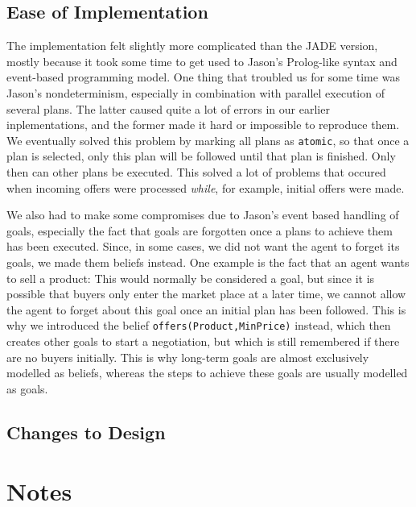 \documentclass[a4paper,11pt]{article}
\begin{document}
\subsection{Ease of Implementation}
The implementation felt slightly more complicated than the JADE version, mostly because it took some time to get used to Jason's Prolog-like syntax and event-based programming model. One thing that troubled us for some time was Jason's nondeterminism, especially in combination with parallel execution of several plans. The latter caused quite a lot of errors in our earlier inplementations, and the former made it hard or impossible to reproduce them. We eventually solved this problem by marking all plans as \texttt{atomic}, so that once a plan is selected, only this plan will be followed until that plan is finished. Only then can other plans be executed. This solved a lot of problems that occured when incoming offers were processed \emph{while}, for example, initial offers were made.

We also had to make some compromises due to Jason's event based handling of goals, especially the fact that goals are forgotten once a plans to achieve them has been executed. Since, in some cases, we did not want the agent to forget its goals, we made them beliefs instead. One example is the fact that an agent wants to sell a product: This would normally be considered a goal, but since it is possible that buyers only enter the market place at a later time, we cannot allow the agent to forget about this goal once an initial plan has been followed. This is why we introduced the belief \texttt{offers(Product,MinPrice)} instead, which then creates other goals to start a negotiation, but which is still remembered if there are no buyers initially. This is why long-term goals are almost exclusively modelled as beliefs, whereas the steps to achieve these goals are usually modelled as goals.


\subsection{Changes to Design}


\section{Notes}
\end{document}
